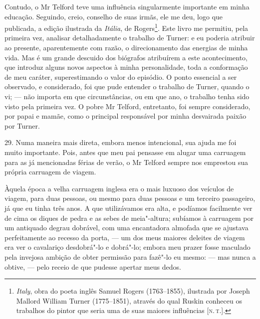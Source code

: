 Contudo, o Mr Telford teve uma influência singularmente importante em
minha educação. Seguindo, creio, conselho de suas irmãs, ele me deu,
logo que publicada, a edição ilustrada da \emph{Itália}, de
Rogers\footnote{\emph{Italy}, obra do poeta inglês Samuel Rogers
  (1763--1855), ilustrada por Joseph Mallord William Turner (1775--1851),
  através do qual Ruskin conheceu os trabalhos do pintor que seria uma
  de suas maiores influências {[}\textsc{n.\,t.}{]}.}. Este livro me permitiu,
pela primeira vez, analisar detalhadamente o trabalho de Turner: e eu
poderia atribuir ao presente, aparentemente com razão, o direcionamento
das energias de minha vida. Mas é um grande descuido dos biógrafos
atribuírem a este acontecimento, que introduz alguns novos aspectos à
minha personalidade, toda a conformação de meu caráter, superestimando o
valor do episódio. O ponto essencial a ser observado, e considerado, foi
que pude entender o trabalho de Turner, quando o vi; --- não importa em
que circunstâncias, ou em que ano, o trabalho tenha sido visto pela
primeira vez. O pobre Mr Telford, entretanto, foi sempre considerado,
por papai e mamãe, como o principal responsável por minha desvairada
paixão por Turner.

29. Numa maneira mais direta, embora menos intencional, sua ajuda me foi
muito importante. Pois, antes que meu pai pensasse em alugar uma
carruagem para as já mencionadas férias de verão, o Mr Telford sempre
nos emprestou sua própria carruagem de viagem.

Àquela época a velha carruagem inglesa era o mais luxuoso dos veículos
de viagem, para duas pessoas, ou mesmo para duas pessoas e um terceiro
passageiro, já que eu tinha três anos. A que utilizávamos era alta, e
podíamos facilmente ver de cima os diques de pedra e as sebes de
meia"-altura; subíamos à carruagem por um antiquado degrau dobrável, com
uma encantadora almofada que se ajustava perfeitamente ao recesso da
porta, --- um dos meus maiores deleites de viagem era ver o cavalariço
desdobrá"-lo e dobrá"-lo; embora meu prazer fosse maculado pela invejosa
ambição de obter permissão para fazê"-lo eu mesmo: --- mas nunca a obtive,
--- pelo receio de que pudesse apertar meus dedos.

